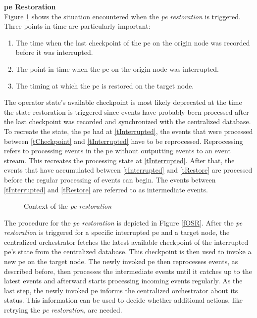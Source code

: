 \textbf{\acrlong{pe} Restoration}\\
Figure \ref{fTimingOSR} shows the situation encountered when the \textit{\acrshort{pe} restoration} is triggered. Three points in time are particularly important:

\begin{enumerate}
    \item \label{tCheckpoint}The time when the last checkpoint of the \gls{pe} on the origin node was recorded before it was interrupted.
    \item \label{tInterrupted}The point in time when the \gls{pe} on the origin node was interrupted.
    \item \label{tRestore} The timing at which the \gls{pe} is restored on the target node.
\end{enumerate}

The operator state's available checkpoint is most likely deprecated at the time the state restoration is triggered since events have probably been processed after the last checkpoint was recorded and synchronized with the centralized database. To recreate the state, the \gls{pe} had at \ref{tInterrupted}, the events that were processed between \ref{tCheckpoint} and \ref{tInterrupted} have to be reprocessed. Reprocessing refers to processing events in the \gls{pe} without outputting events to an event stream. This recreates the processing state at \ref{tInterrupted}. After that, the events that have accumulated between \ref{tInterrupted} and \ref{tRestore} are processed before the regular processing of events can begin. The events between \ref{tInterrupted} and \ref{tRestore} are referred to as intermediate events.\\

\begin{figure}[!ht]
\graphicspath{{./figures/code/}}

\caption{Context of the \textit{\acrshort{pe} restoration}}
\label{fTimingOSR}
\end{figure}

The procedure for the \textit{\acrshort{pe} restoration} is depicted in Figure \ref{fOSR}. After the \textit{\acrshort{pe} restoration} is triggered for a specific interrupted \gls{pe} and a target node, the centralized orchestrator fetches the latest available checkpoint of the interrupted \gls{pe}'s state from the centralized database. This checkpoint is then used to invoke a new \gls{pe} on the target node. The newly invoked \gls{pe} then reprocesses events, as described before, then processes the intermediate events until it catches up to the latest events and afterward starts processing incoming events regularly. As the last step, the newly invoked \gls{pe} informs the centralized orchestrator about its status. This information can be used to decide whether additional actions, like retrying the \textit{\acrshort{pe} restoration}, are needed.\par

